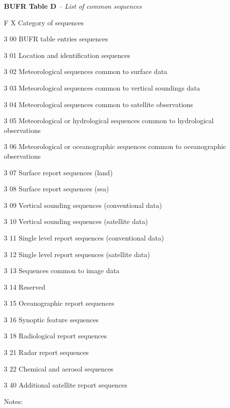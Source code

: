 \textbf{BUFR Table D} \emph{-- List of common sequences}

F X Category of sequences

3 00 BUFR table entries sequences

3 01 Location and identification sequences

3 02 Meteorological sequences common to surface data

3 03 Meteorological sequences common to vertical soundings data

3 04 Meteorological sequences common to satellite observations

3 05 Meteorological or hydrological sequences common to hydrological observations

3 06 Meteorological or oceanographic sequences common to oceanographic observations

3 07 Surface report sequences (land)

3 08 Surface report sequences (sea)

3 09 Vertical sounding sequences (conventional data)

3 10 Vertical sounding sequences (satellite data)

3 11 Single level report sequences (conventional data)

3 12 Single level report sequences (satellite data)

3 13 Sequences common to image data

3 14 Reserved

3 15 Oceanographic report sequences

3 16 Synoptic feature sequences

3 18 Radiological report sequences

3 21 Radar report sequences

3 22 Chemical and aerosol sequences

3 40 Additional satellite report sequences

Notes:

